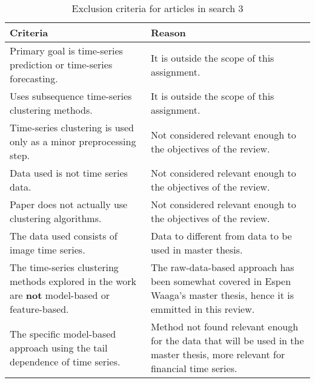 \begin{table*}
    \centering
    \begin{tabular}{p{}p{}}
        \toprule
        Criteria                                                                                               & Reason \\
        \midrule
        Primary goal is time-series prediction or time-series forecasting.                                                    & It is outside the scope of this assignment.\\
        Uses subsequence time-series clustering methods.                                                       & It is outside the scope of this assignment.\\
        Time-series clustering is used only as a minor preprocessing step.                                     & Not considered relevant enough to the objectives of the review.\\
        Data used is not time series data.                                                                     & Not considered relevant enough to the objectives of the review.\\
        Paper does not actually use clustering algorithms.                                                     & Not considered relevant enough to the objectives of the review.\\
        The data used consists of image time series.                                                           & Data to different from data to be used in master thesis.\\
        The time-series clustering methods explored in the work are \textbf{not} model-based or feature-based. & The raw-data-based approach has been somewhat covered in Espen Waaga's master thesis, hence it is emmitted in this review.\\
        The specific model-based approach using the tail dependence of time series.                            & Method not found relevant enough for the data that will be used in the master thesis, more relevant for financial time series.\\
        \bottomrule
    \end{tabular}
    \caption{Exclusion criteria for articles in search 3}
    \label{tab:excl_crit}
\end{table*}
